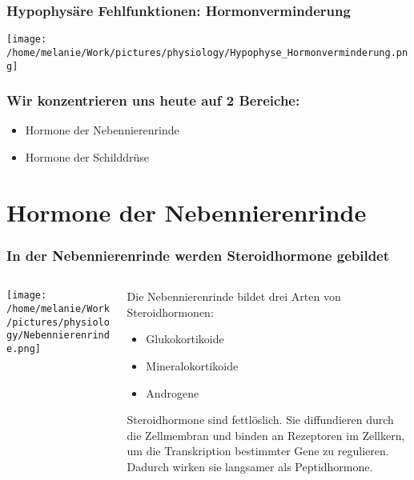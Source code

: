 \documentclass{beamer}
\begin{document}
\begin{frame}
\frametitle{Hypophysäre Fehlfunktionen: Hormonverminderung}

\begin{center}
\texttt{[image: /home/melanie/Work/pictures/physiology/Hypophyse\_Hormonverminderung.png]}
\end{center}

\end{frame}


\begin{frame}
\frametitle{Wir konzentrieren uns heute auf 2 Bereiche:}

\begin{itemize}
\item
Hormone der Nebennierenrinde
\item
Hormone der Schilddrüse
\end{itemize}

\end{frame}

\section{Hormone der Nebennierenrinde}




\begin{frame}
\frametitle{In der Nebennierenrinde werden Steroidhormone gebildet}

\begin{columns}[c]

\begin{column}{6cm}
\texttt{[image: /home/melanie/Work/pictures/physiology/Nebennierenrinde.png]}
\end{column}

\begin{column}{5cm}

Die Nebennierenrinde bildet drei Arten von Steroidhormonen:
\begin{itemize}
\item
Glukokortikoide
\item
Mineralokortikoide
\item
Androgene
\end{itemize}

\pause

Steroidhormone sind fettlöslich. Sie diffundieren durch die Zellmembran und binden an Rezeptoren im Zellkern, um die Transkription bestimmter Gene zu regulieren. Dadurch wirken sie langsamer als Peptidhormone. 

\end{column}

\end{columns}

\end{frame}
\end{document}
